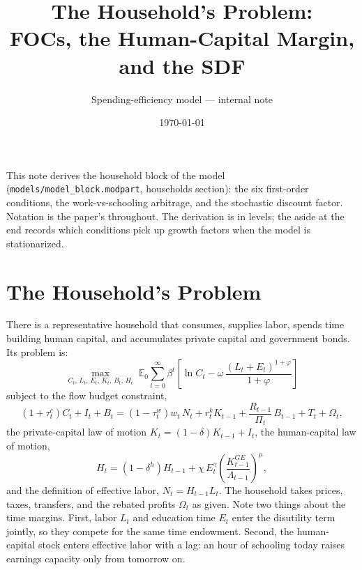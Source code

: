 \documentclass[11pt]{article}
\title{The Household's Problem:\\ FOCs, the Human-Capital Margin, and the SDF}
\author{Spending-efficiency model --- internal note}
\date{\today}
\begin{document}
\maketitle

\noindent
This note derives the household block of the model
(\texttt{models/model\_block.modpart}, households section): the six first-order
conditions, the work-vs-schooling arbitrage, and the stochastic discount factor.
Notation is the paper's throughout. The derivation is in levels; the aside at the
end records which conditions pick up growth factors when the model is
stationarized.

\section{The Household's Problem}

There is a representative household that consumes, supplies labor, spends time
building human capital, and accumulates private capital and government bonds. Its
problem is:
\begin{equation*}
    \max_{C_t,\,L_t,\,E_t,\,K_t,\,B_t,\,H_t} \;
    \mathbb{E}_0 \sum_{t=0}^{\infty} \beta^{t}
    \left[\ln C_t - \omega\,\frac{\left(L_t + E_t\right)^{1+\varphi}}{1+\varphi}\right]
\end{equation*}
subject to the flow budget constraint,
\begin{equation}\label{eq:budget}
    \left(1+\tau_t^{c}\right) C_t + I_t + B_t
    = \left(1-\tau_t^{w}\right) w_t\, N_t + r_t^{k} K_{t-1}
    + \frac{R_{t-1}}{\Pi_t}\, B_{t-1} + T_t + \Omega_t,
\end{equation}
the private-capital law of motion $K_t = (1-\delta)K_{t-1} + I_t$, the
human-capital law of motion,
\begin{equation}\label{eq:hlom}
    H_t = \left(1-\delta^{h}\right) H_{t-1}
    + \chi\, E_t^{\gamma} \left(\frac{K_{t-1}^{GE}}{\Lambda_{t-1}}\right)^{\mu},
\end{equation}
and the definition of effective labor, $N_t = H_{t-1} L_t$. The household takes
prices, taxes, transfers, and the rebated profits $\Omega_t$ as given. Note two
things about the time margins. First, labor $L_t$ and education time $E_t$ enter
the disutility term jointly, so they compete for the same time endowment. Second,
the human-capital stock enters effective labor with a lag: an hour of schooling
today raises earnings capacity only from tomorrow on.
\end{document}
